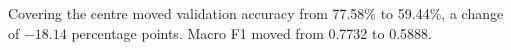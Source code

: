 Covering the centre moved validation accuracy from 77.58\% to 59.44\%, a change of $-18.14$ percentage points. Macro F1 moved from 0.7732 to 0.5888.
